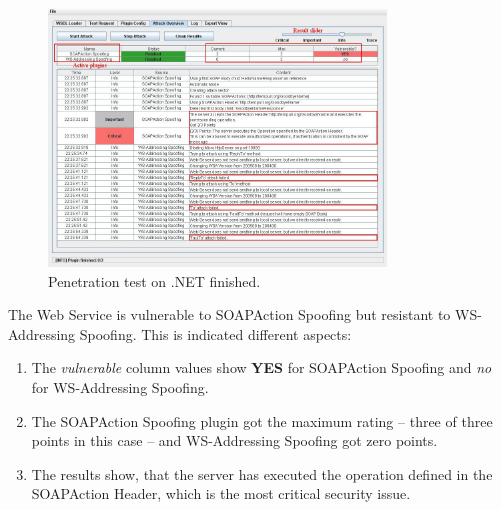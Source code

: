 \begin{figure}[h!]
    \begin{center}
        \includegraphics[width=0.8\textwidth]{img/attack_done}
    \end{center}
    \caption{Penetration test on .NET finished.}
    \label{fig:attack_done}
\end{figure}

The Web Service is vulnerable to SOAPAction Spoofing but resistant to
WS-Addressing Spoofing. This is indicated different aspects:

\begin{enumerate}
    \item The \emph{vulnerable} column values show \textbf{YES} for SOAPAction Spoofing and \emph{no} for WS-Addressing Spoofing.
    \item The SOAPAction Spoofing plugin got the maximum rating -- three of three points in this case -- and WS-Addressing Spoofing got zero points.
    \item The results show, that the server has executed the operation defined
        in the SOAPAction Header, which is the most critical security issue.
\end{enumerate}
